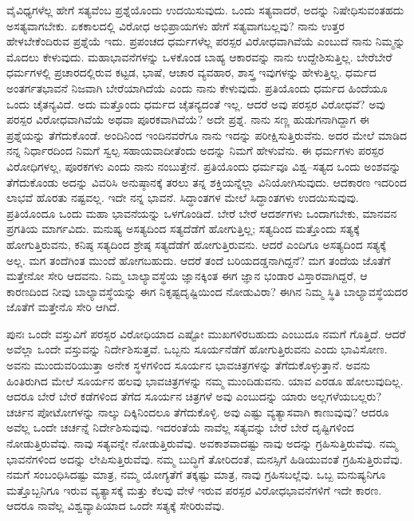 ವೈವಿಧ್ಯಗಳೆಲ್ಲ ಹೇಗೆ ಸತ್ಯವೆಂಬ ಪ್ರಶ್ನೆಯೊಂದು ಉದಯಿಸುವುದು. ಒಂದು ಸತ್ಯವಾದರೆ, ಅದನ್ನು ನಿಷೇಧಿಸುವಂತಹದು ಅಸತ್ಯವಾಗಬೇಕು. ಏಕಕಾಲದಲ್ಲಿ ವಿರೋಧ ಅಭಿಪ್ರಾಯಗಳು ಹೇಗೆ ಸತ್ಯವಾಗಬಲ್ಲವು? ನಾನು ಉತ್ತರ ಹೇಳಬೇಕೆಂದಿರುವ ಪ್ರಶ್ನೆಯೆ ಇದು. ಪ್ರಪಂಚದ ಧರ್ಮಗಳೆಲ್ಲ ಪರಸ್ಪರ ವಿರೋಧವಾಗಿವೆಯೆ ಎಂಬುದೆ ನಾನು ನಿಮ್ಮನ್ನು ಮೊದಲು ಕೇಳುವುದು. ಮಹಾಭಾವನೆಗಳನ್ನು ಒಳಕೊಂಡ ಬಾಹ್ಯ ಆಕಾರವನ್ನು ನಾನು ಉದ್ದೇಶಿಸುತ್ತಿಲ್ಲ. ಬೇರೆಬೇರೆ ಧರ್ಮಗಳಲ್ಲಿ ಪ್ರಚಾರದಲ್ಲಿರುವ ಕಟ್ಟಡ, ಭಾಷೆ, ಆಚಾರ ವ್ಯವಹಾರ, ಶಾಸ್ತ್ರ ಇವುಗಳನ್ನು ಹೇಳುತ್ತಿಲ್ಲ. ಧರ್ಮದ ಅಂತರ್ಗತಭಾವನೆ ನಿಜವಾಗಿ ಬೇರೆಯಾಗಿದೆಯೆ ಎಂದು ನಾನು ಕೇಳುವುದು. ಪ್ರತಿಯೊಂದು ಧರ್ಮದ ಹಿಂದೆಯೂ ಒಂದು ಚೈತನ್ಯವಿದೆ. ಅದು ಮತ್ತೊಂದು ಧರ್ಮದ ಚೈತನ್ಯದಂತೆ ಇಲ್ಲ. ಆದರೆ ಅವು ಪರಸ್ಪರ ವಿರೋಧವೆ? ಅವು ಪರಸ್ಪರ ವಿರೋಧವಾಗಿವೆಯೆ ಅಥವಾ ಪೂರಕವಾಗಿವೆಯೆ? ಅದೇ ಪ್ರಶ್ನೆ. ನಾನು ಸಣ್ಣ ಹುಡುಗನಾಗಿದ್ದಾಗ ಈ ಪ್ರಶ್ನೆಯನ್ನು ತೆಗೆದುಕೊಂಡೆ. ಅಂದಿನಿಂದ ಇಂದಿನವರೆಗೂ ನಾನು ಇದನ್ನು ಪರೀಕ್ಷಿಸುತ್ತಿರುವೆನು. ಅದರ ಮೇಲೆ ಮಾಡಿದ ನನ್ನ ನಿರ್ಧಾರದಿಂದ ನಿಮಗೆ ಸ್ವಲ್ಪ ಸಹಾಯವಾದೀತೆಂದು ಅದನ್ನು ನಿಮಗೆ ಹೇಳುವೆನು. ಈ ಧರ್ಮಗಳು ಪರಸ್ಪರ ವಿರೋಧಿಗಳಲ್ಲ, ಪೂರಕಗಳು ಎಂದು ನಾನು ನಂಬುತ್ತೇನೆ. ಪ್ರತಿಯೊಂದು ಧರ್ಮವೂ ವಿಶ್ವ–ಸತ್ಯದ ಒಂದು ಅಂಶವನ್ನು ತೆಗೆದುಕೊಂಡು ಅದನ್ನು ವಿವರಿಸಿ ಅನುಷ್ಠಾನಕ್ಕೆ ತರಲು ತನ್ನ ಶಕ್ತಿಯನ್ನೆಲ್ಲಾ ವಿನಿಯೋಗಿಸುವುದು. ಆದಕಾರಣ ಇದರಿಂದ ಲಾಭವೆ ಹೊರತು ನಷ್ಟವಲ್ಲ. ಇದೇ ನನ್ನ ಭಾವನೆ. ಸಿದ್ಧಾಂತಗಳ ಮೇಲೆ ಸಿದ್ಧಾಂತಗಳು ಉದಯಿಸುವುವು. ಪ್ರತಿಯೊಂದೂ ಒಂದು ಮಹಾ ಭಾವನೆಯನ್ನು ಒಳಗೊಂಡಿದೆ. ಬೇರೆ ಬೇರೆ ಆದರ್ಶಗಳು ಒಂದಾಗಬೇಕು, ಮಾನವನ ಪ್ರಗತಿಯ ಮಾರ್ಗವಿದು. ಮನುಷ್ಯ ಅಸತ್ಯದಿಂದ ಸತ್ಯದೆಡೆಗೆ ಹೋಗುತ್ತಿಲ್ಲ; ಸತ್ಯದಿಂದ ಮತ್ತೊಂದು ಸತ್ಯಕ್ಕೆ ಹೋಗುತ್ತಿರುವನು, ಕನಿಷ್ಠ ಸತ್ಯದಿಂದ ಶ್ರೇಷ್ಠ ಸತ್ಯದೆಡೆಗೆ ಹೋಗುತ್ತಿರುವನು. ಆದರೆ ಎಂದಿಗೂ ಅಸತ್ಯದಿಂದ ಸತ್ಯಕ್ಕೆ ಅಲ್ಲ. ಮಗ ತಂದೆಗಿಂತ ಮುಂದೆ ಹೋಗಬಹುದು. ಆದರೆ ತಂದೆ ಬರಿಯ\break ದಡ್ಡನಾಗಿದ್ದನೆ? ಮಗ ತಂದೆಯ ಜೊತೆಗೆ ಮತ್ತೇನೋ ಸೇರಿ ಆದವನು. ನಿಮ್ಮ ಬಾಲ್ಯಾವಸ್ಥೆಯ ಜ್ಞಾನಕ್ಕಿಂತ ಈಗ ಜ್ಞಾನ ಭಂಡಾರ ವಿಸ್ತಾರವಾಗಿದ್ದರೆ, ಆ ಕಾರಣದಿಂದ ನೀವು ಬಾಲ್ಯಾವಸ್ಥೆಯನ್ನು ಈಗ ನಿಕೃಷ್ಟದೃಷ್ಟಿಯಿಂದ ನೋಡುವಿರಾ? ಈಗಿನ ನಿಮ್ಮ ಸ್ಥಿತಿ ಬಾಲ್ಯಾವಸ್ಥೆಯದರ ಜೊತೆಗೆ ಮತ್ತೇನೊ ಸೇರಿ ಆಗಿದೆ.


ಪುನಃ ಒಂದೇ ವಸ್ತುವಿಗೆ ಪರಸ್ಪರ ವಿರೋಧಿಯಾದ ಎಷ್ಟೋ ಮುಖಗಳಿರಬಹುದು ಎಂಬುದೂ ನಮಗೆ ಗೊತ್ತಿದೆ. ಆದರೆ ಅವೆಲ್ಲಾ ಒಂದೇ ವಸ್ತುವನ್ನು ನಿರ್ದೇಶಿಸುತ್ತವೆ. ಒಬ್ಬನು ಸೂರ್ಯನೆಡೆಗೆ ಹೋಗುತ್ತಿರುವನು ಎಂದು ಭಾವಿಸೋಣ. ಅವನು ಮುಂದುವರಿಯುತ್ತಾ ಅನೇಕ ಸ್ಥಳಗಳಿಂದ ಸೂರ್ಯನ ಭಾವಚಿತ್ರಗಳನ್ನು ತೆಗೆದುಕೊಳ್ಳುತ್ತಾನೆ. ಅವನು ಹಿಂತಿರುಗಿದ ಮೇಲೆ ಸೂರ್ಯನ ಹಲವು ಭಾವಚಿತ್ರಗಳನ್ನು ನಮ್ಮ ಮುಂದಿಡುವನು. ಯಾವ ಎರಡೂ ಹೋಲುವುದಿಲ್ಲ. ಆದರೂ ಬೇರೆ ಬೇರೆ ಕಡೆಗಳಿಂದ ತೆಗೆದ ಸೂರ್ಯನ ಚಿತ್ರಗಳೆ ಅವು ಎಂಬುದನ್ನು ಯಾರು ಅಲ್ಲಗಳೆಯಬಲ್ಲರು? ಚರ್ಚಿನ ಪೋಟೋಗಳನ್ನು ನಾಲ್ಕು ದಿಕ್ಕಿನಿಂದಲೂ ತೆಗೆದುಕೊಳ್ಳಿ. ಅವು ಎಷ್ಟು ವ್ಯತ್ಯಾಸವಾಗಿ ಕಾಣುವುವು? ಆದರೂ ಅವೆಲ್ಲ ಒಂದೇ ಚರ್ಚನ್ನೆ ನಿರ್ದೇಶಿಸುವುವು. ಇದರಂತೆಯೆ ನಾವೆಲ್ಲ ಸತ್ಯವನ್ನು ಬೇರೆ ಬೇರೆ ದೃಷ್ಟಿಗಳಿಂದ ನೋಡುತ್ತಿರುವೆವು. ನಾವು ಸತ್ಯವನ್ನೇ ನೋಡುತ್ತಿರುವೆವು. ಅವಕಾಶವಾದಷ್ಟು ನಾವು ಅದನ್ನು ಗ್ರಹಿಸುತ್ತಿರುವೆವು. ನಮ್ಮ ಭಾವನೆಗಳಿಂದ ಅದನ್ನು ಲೇಪಿಸುತ್ತಿರುವೆವು. ನಮ್ಮ ಬುದ್ಧಿಗೆ ತೋರಿದಂತೆ, ಮನಸ್ಸಿಗೆ ಹಿಡಿಯುವಂತೆ ಗ್ರಹಿಸುತ್ತಿರುವೆವು. ನಮಗೆ ಸಂಬಂಧಿಸಿದಷ್ಟು ಮಾತ್ರ, ನಮ್ಮ ಯೋಗ್ಯತೆಗೆ ತಕ್ಕಷ್ಟು ಮಾತ್ರ, ನಾವು ಗ್ರಹಿಸಬಲ್ಲೆವು. ಒಬ್ಬ ಮನುಷ್ಯನಿಗೂ ಮತ್ತೊಬ್ಬನಿಗೂ ಇರುವ ವ್ಯತ್ಯಾಸಕ್ಕೆ ಮತ್ತು ಕೆಲವು ವೇಳೆ ಇರುವ ಪರಸ್ಪರ ವಿರೋಧಭಾವನೆಗಳಿಗೆ ಇದೇ ಕಾರಣ. ಆದರೂ ನಾವೆಲ್ಲ ವಿಶ್ವವ್ಯಾಪಿಯಾದ ಒಂದೇ ಸತ್ಯಕ್ಕೆ ಸೇರಿರುವೆವು.

